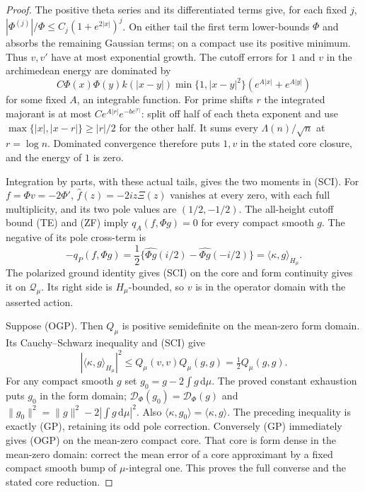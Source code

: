 \documentclass[11pt]{article}
\theoremstyle{remark}\newtheorem{remark}[theorem]{Remark}
\newcommand{\dd}{\,\mathrm d}
\begin{document}
\begin{proof}
The positive theta series and its differentiated terms give, for
each fixed $j$, $|\Phi^{(j)}|/\Phi\le C_j(1+e^{2|x|})^j$.
On either tail the first term lower-bounds $\Phi$ and absorbs
the remaining Gaussian terms; on a compact use its positive minimum.
Thus $v,v'$ have at most exponential growth. The cutoff errors
for $1$ and $v$ in the archimedean energy are dominated by
\[
 C\Phi(x)\Phi(y)k(|x-y|)\min\{1,|x-y|^2\}
               (e^{A|x|}+e^{A|y|})
\]
for some fixed $A$, an integrable function. For prime shifts $r$
the integrated majorant is at most
$Ce^{A|r|}e^{-b e^{|r|}}$: split off half of each theta exponent
and use $\max\{|x|,|x-r|\}\ge|r|/2$ for the other half.
It sums every $\Lambda(n)/\sqrt n$ at $r=\log n$.
Dominated convergence therefore puts $1,v$ in the stated core
closure, and the energy of $1$ is zero.

Integration by parts, with these actual tails, gives the two
moments in (SCI). For $f=\Phi v=-2\Phi'$,
$\widehat f(z)=-2iz\Xi(z)$ vanishes at every zero, with each
full multiplicity, and its two pole values are $(1/2,-1/2)$.
The all-height cutoff bound (TE) and (ZF) imply
$q_A(f,\Phi g)=0$ for every compact smooth $g$.
The negative of its pole cross-term is
\[
 -q_P(f,\Phi g)=\frac12\{
       \widehat{\Phi g}(i/2)-\widehat{\Phi g}(-i/2)\}
                       =\langle\kappa,g\rangle_{H_\mu}.
\]
The polarized ground identity gives (SCI) on the core and
form continuity gives it on $\mathcal Q_\mu$.
Its right side is $H_\mu$-bounded, so $v$ is in the operator
domain with the asserted action.

Suppose (OGP). Then $Q_\mu$ is positive semidefinite on the
mean-zero form domain. Its Cauchy--Schwarz inequality and (SCI)
give
\[
 |\langle\kappa,g\rangle_{H_\mu}|^2
       \le Q_\mu(v,v)Q_\mu(g,g)=\tfrac12Q_\mu(g,g).
\]
For any compact smooth $g$ set $g_0=g-2\int g\dd\mu$.
The proved constant exhaustion puts $g_0$ in the form domain;
$\mathcal D_\Phi(g_0)=\mathcal D_\Phi(g)$ and
$\|g_0\|^2=\|g\|^2-2|\int g\dd\mu|^2$.
Also $\langle\kappa,g_0\rangle=\langle\kappa,g\rangle$.
The preceding inequality is exactly (GP), retaining its odd
pole correction. Conversely (GP) immediately gives (OGP) on
the mean-zero compact core. That core is form dense in the
mean-zero domain: correct the mean error of a core approximant
by a fixed compact smooth bump of $\mu$-integral one.
This proves the full converse and the stated core reduction.
\end{proof}
\end{document}
